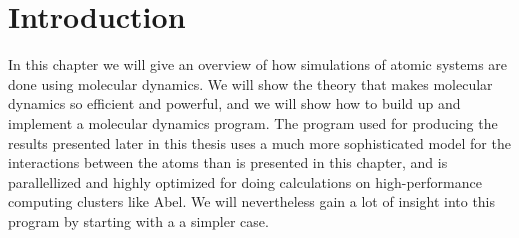 \chapter{Introduction}
In this chapter we will give an overview of how simulations of atomic systems are done using molecular dynamics. We will show the theory that makes molecular dynamics so efficient and powerful, and we will show how to build up and implement a molecular dynamics program. The program used for producing the results presented later in this thesis uses a much more sophisticated model for the interactions between the atoms than is presented in this chapter, and is parallellized and highly optimized for doing calculations on high-performance computing clusters like Abel. We will nevertheless gain a lot of insight into this program by starting with a a simpler case.

% 
% 
% 
% 

